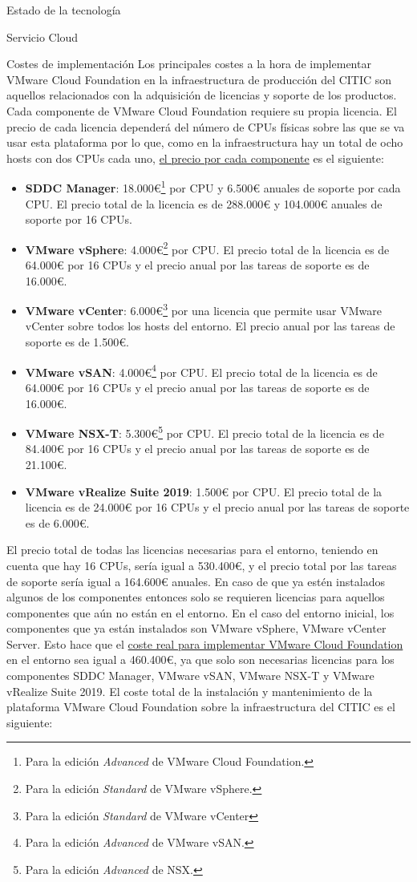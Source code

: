 \begin{chapter}{Estado de la tecnología}
\begin{section}{Servicio Cloud}
    \begin{subsection}{Costes de implementación}
        Los principales costes a la hora de implementar VMware Cloud Foundation en la infraestructura de producción del CITIC son aquellos relacionados con la adquisición de licencias y soporte de los productos. Cada componente de VMware Cloud Foundation requiere su propia licencia\cite{licenses}. El precio de cada licencia dependerá del número de CPUs físicas sobre las que se va usar esta plataforma por lo que, como en la infraestructura hay un total de ocho hosts con dos CPUs cada uno, \underline{el precio por cada componente} es el siguiente:
        \begin{itemize}
            \item \textbf{SDDC Manager}: 18.000€\footnote{Para la edición \textit{Advanced} de VMware Cloud Foundation.} por CPU y 6.500€ anuales de soporte por cada CPU. El precio total de la licencia es de 288.000€ y 104.000€ anuales de soporte por 16 CPUs.
            \item \textbf{VMware vSphere}: 4.000€\footnote{Para la edición \textit{Standard} de VMware vSphere.} por CPU. El precio total de la licencia es de 64.000€ por 16 CPUs y el precio anual por las tareas de soporte es de 16.000€.
            \item \textbf{VMware vCenter}: 6.000€\footnote{Para la edición \textit{Standard} de VMware vCenter} por una licencia que permite usar VMware vCenter sobre todos los hosts del entorno. El precio anual por las tareas de soporte es de 1.500€.
            \item \textbf{VMware vSAN}: 4.000€\footnote{Para la edición \textit{Advanced} de VMware vSAN.} por CPU. El precio total de la licencia es de 64.000€ por 16 CPUs y el precio anual por las tareas de soporte es de 16.000€.
            \item \textbf{VMware NSX-T}: 5.300€\footnote{Para la edición \textit{Advanced} de NSX.} por CPU. El precio total de la licencia es de 84.400€ por 16 CPUs y el precio anual por las tareas de soporte es de 21.100€.
            \item \textbf{VMware vRealize Suite 2019}: 1.500€ por CPU. El precio total de la licencia es de 24.000€ por 16 CPUs y el precio anual por las tareas de soporte es de 6.000€.
        \end{itemize}
        El precio total de todas las licencias necesarias para el entorno, teniendo en cuenta que hay 16 CPUs, sería igual a 530.400€, y el precio total por las tareas de soporte sería igual a 164.600€ anuales. En caso de que ya estén instalados algunos de los componentes entonces solo se requieren licencias para aquellos componentes que aún no están en el entorno. En el caso del entorno inicial, los componentes que ya están instalados son VMware vSphere, VMware vCenter Server. Esto hace que el \underline{coste real para implementar VMware Cloud Foundation} en el entorno sea igual a 460.400€, ya que solo son necesarias licencias para los componentes SDDC Manager, VMware vSAN, VMware NSX-T y VMware vRealize Suite 2019. El coste total de la instalación y mantenimiento de la plataforma VMware Cloud Foundation sobre la infraestructura del CITIC es el siguiente:

\end{subsection}
\end{section}
\end{chapter}
